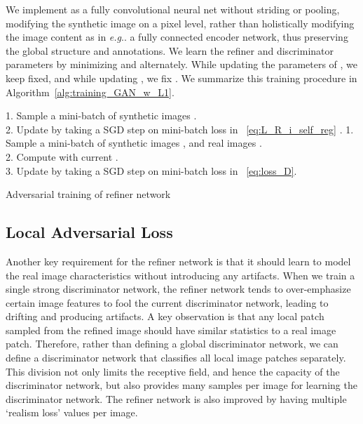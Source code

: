 \documentclass[10pt,twocolumn,letterpaper]{article}
\makeatletter
\DeclareRobustCommand\onedot{\futurelet\@let@token\@onedot}
\def\@onedot{\ifx\@let@token.\else.\null\fi\xspace}
\def\eg{\emph{e.g}\onedot} \def\Eg{\emph{E.g}\onedot}
\makeatother
\begin{document}
We implement  as a fully convolutional neural net without striding or pooling,
modifying the synthetic  image on a pixel level, rather than holistically modifying the image content as in \eg a fully connected encoder network, thus preserving the global structure and annotations.
We learn  the refiner and discriminator parameters by minimizing  and  alternately. 
While updating the parameters of , we keep  fixed, and while updating ,  we fix  . We summarize this training procedure in Algorithm~\ref{alg:training_GAN_w_L1}.




\begin{algorithm}[t]
\For { } 
{
\For { } 
{
1. Sample a mini-batch of  synthetic images . \\
2. Update  by taking a SGD step on mini-batch loss  in ~\eqref{eq:L_R_i_self_reg} .
}
\For { } 
{
1. Sample a mini-batch of  synthetic images , and real images . \\
2. Compute  with current . \\
3. Update  by taking a SGD step  on mini-batch loss  in ~\eqref{eq:loss_D}.
}

}
\caption{Adversarial training of refiner network }
\label{alg:training_GAN_w_L1}
\vspace{-0.2cm}
\end{algorithm}



\subsection{Local Adversarial Loss}
Another key requirement for the refiner network is that it should learn to model the real image characteristics without introducing any artifacts. When we train a single strong discriminator network, the refiner network tends to over-emphasize certain image features to fool the current discriminator network, leading to drifting and producing artifacts.
A key observation is that any local patch sampled from the refined image should have similar statistics to a real image patch. 
Therefore, rather than defining a global discriminator network, we can define a discriminator network that classifies all local image patches separately.
This division not only limits the receptive field, and hence the capacity of the discriminator network, but also provides many samples per image for learning the discriminator network. 
The refiner network is also improved by having multiple `realism loss' values per image. 
\end{document}
